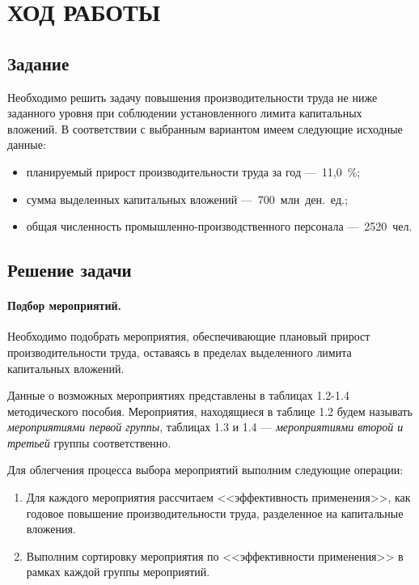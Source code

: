 \section{ХОД РАБОТЫ}

\subsection{Задание}

Необходимо решить задачу повышения производительности труда не ниже заданного уровня
при соблюдении установленного лимита капитальных вложений. В соответствии с выбранным вариантом
имеем следующие исходные данные:

\begin{itemize}
  \item планируемый прирост производительности труда за год ---~11,0~\%;
  \item сумма выделенных капитальных вложений ---~700~млн~ден.~ед.;
  \item общая численность промышленно-производственного персонала ---~2520~чел.
\end{itemize}

\subsection{Решение задачи}

\paragraph{Подбор мероприятий.}

Необходимо подобрать мероприятия, обеспечивающие плановый прирост производительности
труда, оставаясь в пределах выделенного лимита капитальных вложений.

Данные о возможных мероприятиях представлены в таблицах 1.2-1.4 методического пособия.
Мероприятия, находящиеся в таблице 1.2 будем называть \textit{мероприятиями первой группы}, 
таблицах 1.3 и 1.4 --- \textit{мероприятиями второй и третьей} группы соответственно.

Для облегчения процесса выбора мероприятий выполним следующие операции:

\begin{enumerate}
  \item Для каждого мероприятия рассчитаем <<эффективность применения>>,
    как годовое повышение производительности труда, разделенное на капитальные вложения.
  \item Выполним сортировку мероприятия по <<эффективности применения>> в рамках каждой
    группы мероприятий.
\end{enumerate}

